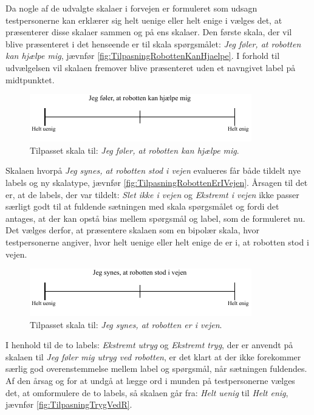 \noindent
%
Da nogle af de udvalgte skalaer i forvejen er formuleret som udsagn testpersonerne kan erklærer sig helt uenige eller helt enige i vælges det, at præsenterer disse skalaer sammen og på ens skalaer. Den første skala, der vil blive præsenteret i det henseende er til skala spørgsmålet: \textit{Jeg føler, at robotten kan hjælpe mig}, jævnfør \autoref{fig:TilpasningRobottenKanHjaelpe}. I forhold til udvælgelsen vil skalaen fremover blive præsenteret uden et navngivet label på midtpunktet. 
%
\begin{figure}[H]
\centering
\includegraphics[width =\textwidth]{Figure/TilpasningAfSkalaer/TilpassetRobottenKanHjaelpe} 
\caption{Tilpasset skala til: \textit{Jeg føler, at robotten kan hjælpe mig}.}
\label{fig:TilpasningRobottenKanHjaelpe}
\end{figure}
\noindent
% 
Skalaen hvorpå \textit{Jeg synes, at robotten stod i vejen} evalueres får både tildelt nye labels og ny skalatype, jævnfør \autoref{fig:TilpasningRobottenErIVejen}. Årsagen til det er, at de labels, der var tildelt: \textit{Slet ikke i vejen} og \textit{Ekstremt i vejen} ikke passer særligt godt til at fuldende sætningen med skala spørgsmålet og fordi det antages, at der kan opstå bias mellem spørgsmål og label, som de formuleret nu. Det vælges derfor, at præsentere skalaen som en bipolær skala, hvor testpersonerne angiver, hvor helt uenige eller helt enige de er i, at robotten stod i vejen.
%
\begin{figure}[H]
\centering
\includegraphics[width =\textwidth]{Figure/TilpasningAfSkalaer/TilpassetRobottenErIVejen} 
\caption{Tilpasset skala til: \textit{Jeg synes, at robotten er i vejen}.}
\label{fig:TilpasningRobottenErIVejen}
\end{figure}
\noindent
%
I henhold til de to labels: \textit{Ekstremt utryg} og \textit{Ekstremt tryg}, der er anvendt på skalaen til \textit{Jeg føler mig utryg ved robotten}, er det klart at der ikke forekommer særlig god overenstemmelse mellem label og spørgsmål, når sætningen fuldendes. Af den årsag og for at undgå at lægge ord i munden på testpersonerne vælges det, at omformulere de to labels, så skalaen går fra: \textit{Helt uenig} til \textit{Helt enig}, jævnfør \autoref{fig:TilpasningTrygVedR}.
